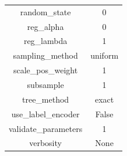 \documentclass[conference]{IEEEtran}
\begin{document}
\begin{table}[!htbp]
\begin{tabular}{c c}
        random\_state & 0 \\
        reg\_alpha & 0 \\
        reg\_lambda & 1 \\
        sampling\_method & uniform \\
        scale\_pos\_weight & 1 \\
        subsample & 1 \\
        tree\_method & exact \\
        use\_label\_encoder & False \\
        validate\_parameters & 1 \\
        verbosity & None \\
        \hline
    \end{tabular}
\end{table}
\end{document}
